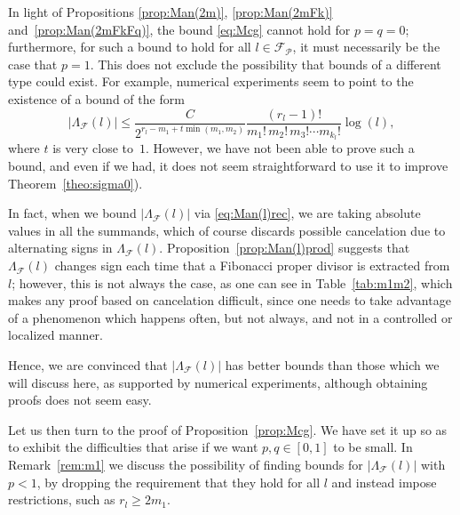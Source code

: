 \documentclass[11pt, a4paper]{article}
\newcommand{\manF}{\Lambda_{\mathcal{F}}}
\newcommand{\Fp}{\mathcal{F}_{\mathcal{P}}}
\theoremstyle{plain}
\theoremstyle{definition}
\begin{document}
In light of Propositions \ref{prop:Man(2m)}, \ref{prop:Man(2mFk)} and~\ref{prop:Man(2mFkFq)}, the bound \eqref{eq:Mcg} cannot hold for $p=q=0$; furthermore, for such a bound to hold for all $l \in \Fp$, it must necessarily be the case that $p = 1$. This does not exclude the possibility that bounds of a different type could exist. For example, numerical experiments seem to point to the existence of a bound of the form
\[
|\manF(l)| \leq 
\frac{C}{2^{r_l-m_1+t\min(m_1,m_2)}}
\dfrac{(r_l-1)!}{m_1!\,m_2!\,m_3! \cdots m_{k_l}!} \log(l),
\]
where $t$ is very close to~$1$. However, we have not been able to prove such a bound, and even if we had, it does not seem straightforward to use it to improve Theorem~\ref{theo:sigma0}).

In fact, when we bound $|\manF(l)|$ via \eqref{eq:Man(l)rec}, we are taking absolute values in all the summands, which of course discards possible cancelation due to alternating signs in $\manF(l)$. Proposition~\ref{prop:Man(l)prod} suggests that $\manF(l)$ changes sign each time that a Fibonacci proper divisor is extracted from $l$; however, this is not always the case, as one can see in Table~\ref{tab:m1m2}, which makes any proof based on cancelation difficult, since one needs to take advantage of a phenomenon which happens often, but not always, and not in a controlled or localized manner.

Hence, we are convinced that $|\manF(l)|$ has better bounds than those which we will discuss here, as supported by numerical experiments, although obtaining proofs does not seem easy.

Let us then turn to the proof of Proposition~\ref{prop:Mcg}. We have set it up so as to exhibit the difficulties that arise if we want $p, q \in [0,1]$ to be small. In Remark~\ref{rem:m1} we discuss the possibility of finding bounds for $|\manF(l)|$ with $p<1$, by dropping the requirement that they hold for all $l$ and instead impose restrictions, such as $r_{l} \geq 2m_{1}$.
\end{document}
